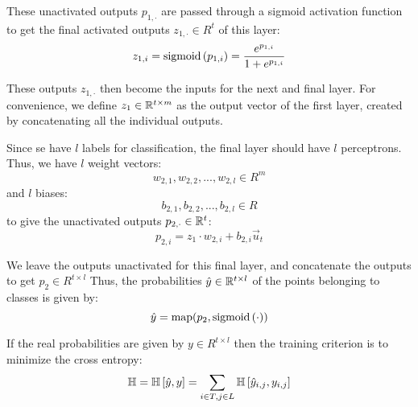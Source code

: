 \documentclass{article}
\begin{document}
  These unactivated outputs $p_{1, \cdot}$ are passed 
  through a sigmoid activation function
  to get the final activated outputs
  $z_{1, \cdot} \in R^{t}$ 
  of this layer:
  \[ z_{1, i} = \text{sigmoid}\left(p_{1, i}\right) 
              = \frac{e^{p_{1, i}}}{1 + e^{p_{1, i}}}
  \]
  
  These outputs $z_{1, \cdot}$ then become 
  the inputs for the next and final layer.
  For convenience, we define
  $z_1 \in \mathbb{R}^{t \times m}$
  as the output vector of the first layer,
  created by concatenating all the individual outputs.
  
  Since se have $l$ labels for classification,
  the final layer should have $l$ perceptrons.
  Thus, we have $l$ weight vectors:
  \[ w_{2, 1}, w_{2, 2}, ..., w_{2, l} \in R^m \]
  and $l$ biases:
  \[ b_{2, 1}, b_{2, 2}, ..., b_{2, l} \in R \]
  to give the unactivated outputs $p_{2, \cdot} \in \mathbb{R}^t$:
  \[ p_{2, i} = z_1 \cdot w_{2, i} + b_{2, i} \overrightarrow u_{t} \]
  
  We leave the outputs unactivated for this final layer,
  and concatenate the outputs to get $p_2 \in {R^{t \times l}}$
  Thus, the probabilities $\hat y \in \mathbb{R}^{t \times l}$
  of the points belonging to classes is given by:
  \[ \hat y = \text{map}(p_2, \text{sigmoid}\left(\cdot\right)) \]
  
  If the real probabilities are given by $y \in R^{t \times l}$
  then the training criterion is to minimize the cross entropy:
  \[
    \mathbb{H}
    = \mathbb{H}\left[ \hat y, y \right]
    = \sum_{i \in T, j \in L} \mathbb{H}\left[ \hat y_{i, j}, y_{i, j} \right]
  \]
  
\end{document}

